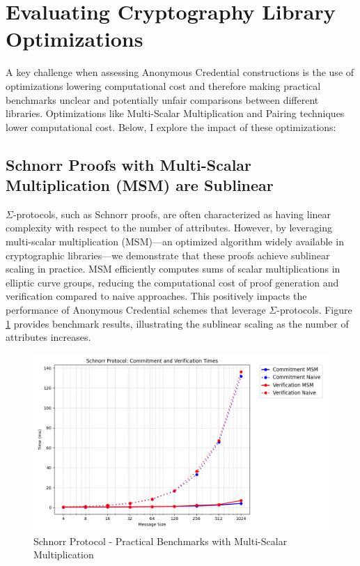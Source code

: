 \section{Evaluating Cryptography Library Optimizations}
A key challenge when assessing Anonymous Credential constructions is the use of optimizations lowering computational cost and therefore making practical benchmarks unclear and potentially unfair comparisons between different libraries. Optimizations like Multi-Scalar Multiplication and Pairing techniques lower computational cost. 
Below, I explore the impact of these optimizations: 



\subsection{Schnorr Proofs with Multi-Scalar Multiplication (MSM) are Sublinear}\label{sigma-protocol-analysis}

$\Sigma$-protocols, such as Schnorr proofs, are often characterized as having linear complexity with respect to the number of attributes. However, by leveraging multi-scalar multiplication (MSM)—an optimized algorithm widely available in cryptographic libraries—we demonstrate that these proofs achieve sublinear scaling in practice. MSM efficiently computes sums of scalar multiplications in elliptic curve groups, reducing the computational cost of proof generation and verification compared to naive approaches. This positively impacts the performance of Anonymous Credential schemes that leverage $\Sigma$-protocols. Figure \ref{fig:schnorr-benchmarks} provides benchmark results, illustrating the sublinear scaling as the number of attributes increases.

\begin{figure}[!htb]
    \centering
    \includegraphics[width=0.75\linewidth]{schnorr_msm_no_msm.png}
    \caption{Schnorr Protocol - Practical Benchmarks with Multi-Scalar Multiplication}
    \label{fig:schnorr-benchmarks}
\end{figure}





